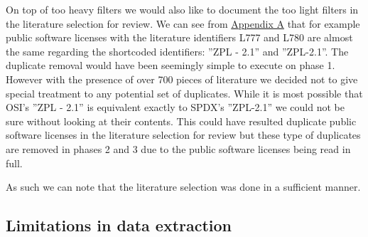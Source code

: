 On top of too heavy filters we would also like to document the too light filters in the literature selection for review. We can see from \hyperref[appendix:a]{Appendix A} that for example public software licenses with the literature identifiers L777 and L780 are almost the same regarding the shortcoded identifiers: ''ZPL - 2.1'' and ''ZPL-2.1''. The duplicate removal would have been seemingly simple to execute on phase 1. However with the presence of over 700 pieces of literature we decided not to give special treatment to any potential set of duplicates. While it is most possible that OSI's ''ZPL - 2.1'' is equivalent exactly to SPDX's ''ZPL-2.1'' we could not be sure without looking at their contents. This could have resulted duplicate public software licenses in the literature selection for review but these type of duplicates are removed in phases 2 and 3 due to the public software licenses being read in full.

As such we can note that the literature selection was done in a sufficient manner.

\subsection{Limitations in data extraction}

